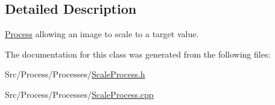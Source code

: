 \subsection{Detailed Description}
\hyperlink{classProcess}{Process} allowing an image to scale to a target value. 

The documentation for this class was generated from the following files\-:\begin{DoxyCompactItemize}
\item 
Src/\-Process/\-Processes/\hyperlink{ScaleProcess_8h}{Scale\-Process.\-h}\item 
Src/\-Process/\-Processes/\hyperlink{ScaleProcess_8cpp}{Scale\-Process.\-cpp}\end{DoxyCompactItemize}
